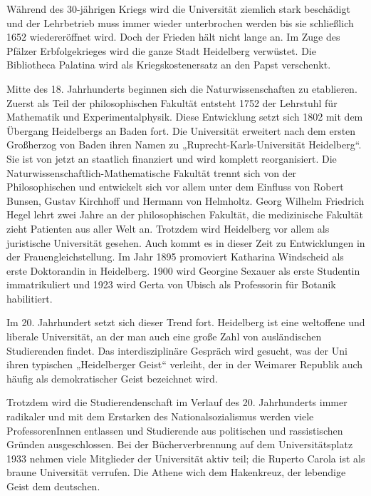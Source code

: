


Während des 30-jährigen Kriegs wird die Universität ziemlich stark beschädigt und 
der Lehrbetrieb muss immer wieder unterbrochen werden bis sie schließlich 1652 
wiedereröffnet wird. Doch der Frieden hält nicht lange an. Im Zuge des Pfälzer 
Erbfolgekrieges wird die ganze Stadt Heidelberg verwüstet. Die Bibliotheca Palatina 
wird als Kriegskostenersatz an den Papst verschenkt. 


Mitte des 18. Jahrhunderts beginnen sich die Naturwissenschaften zu etablieren. 
Zuerst als Teil der philosophischen Fakultät entsteht 1752 der Lehrstuhl für 
Mathematik und Experimentalphysik. Diese Entwicklung setzt sich 1802 mit dem 
Übergang Heidelbergs an Baden fort. Die Universität erweitert nach dem ersten 
Großherzog von Baden ihren Namen zu „Ruprecht-Karls-Universität Heidelberg“. Sie ist 
von jetzt an staatlich finanziert und wird komplett reorganisiert. Die 
Naturwissenschaftlich-Mathematische Fakultät trennt sich von der Philosophischen und 
entwickelt sich vor allem unter dem Einfluss von Robert Bunsen, Gustav Kirchhoff und 
Hermann von Helmholtz. Georg Wilhelm Friedrich Hegel lehrt zwei Jahre an der 
philosophischen Fakultät, die medizinische Fakultät zieht Patienten aus aller Welt an. 
Trotzdem wird Heidelberg vor allem als juristische Universität gesehen. Auch kommt 
es in dieser Zeit zu Entwicklungen in der Frauengleichstellung. Im Jahr 1895 
promoviert Katharina Windscheid als erste Doktorandin in Heidelberg. 1900 wird 
Georgine Sexauer als erste Studentin immatrikuliert und 1923 wird Gerta von Ubisch 
als Professorin für Botanik habilitiert.

Im 20. Jahrhundert setzt sich dieser Trend fort. Heidelberg ist eine weltoffene und 
liberale Universität, an der man auch eine große Zahl von ausländischen Studierenden 
findet. Das interdisziplinäre Gespräch wird gesucht, was der Uni ihren typischen 
„Heidelberger Geist“ verleiht, der in der Weimarer Republik auch häufig als 
demokratischer Geist bezeichnet wird.

Trotzdem wird die Studierendenschaft im Verlauf des 20. Jahrhunderts immer radikaler 
und mit dem Erstarken des Nationalsozialismus werden viele ProfessorenInnen entlassen und 
Studierende aus politischen und rassistischen Gründen ausgeschlossen. Bei der 
Bücherverbrennung auf dem Universitätsplatz 1933 nehmen viele Mitglieder der 
Universität aktiv teil; die Ruperto Carola ist als braune Universität verrufen.
Die Athene wich dem Hakenkreuz, der lebendige Geist dem deutschen. 

